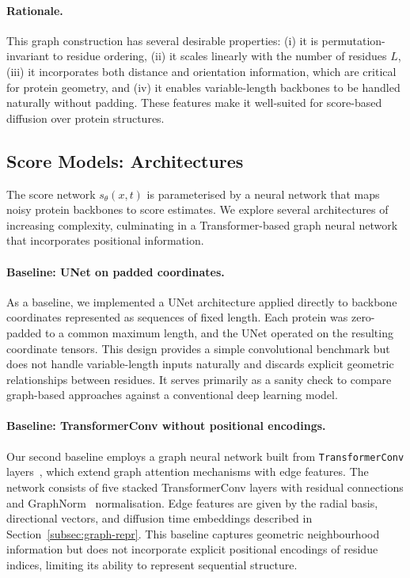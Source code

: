 \documentclass[a4paper,12pt]{article}
\begin{document}
\paragraph{Rationale.}
This graph construction has several desirable properties: (i) it is permutation-invariant to residue ordering, (ii) it scales linearly with the number of residues \(L\), (iii) it incorporates both distance and orientation information, which are critical for protein geometry, and (iv) it enables variable-length backbones to be handled naturally without padding. These features make it well-suited for score-based diffusion over protein structures.

\subsection{Score Models: Architectures}\label{subsec:architectures}
The score network \(s_\theta(x,t)\) is parameterised by a neural network that maps noisy protein backbones to score estimates. We explore several architectures of increasing complexity, culminating in a Transformer-based graph neural network that incorporates positional information.

\paragraph{Baseline: UNet on padded coordinates.}
As a baseline, we implemented a UNet architecture applied directly to backbone coordinates represented as sequences of fixed length. Each protein was zero-padded to a common maximum length, and the UNet operated on the resulting coordinate tensors. This design provides a simple convolutional benchmark but does not handle variable-length inputs naturally and discards explicit geometric relationships between residues. It serves primarily as a sanity check to compare graph-based approaches against a conventional deep learning model.

\paragraph{Baseline: TransformerConv without positional encodings.}
Our second baseline employs a graph neural network built from \texttt{TransformerConv} layers~\cite{PyG1.0,PyG2.0}, which extend graph attention mechanisms with edge features. 
The network consists of five stacked TransformerConv layers with residual connections and GraphNorm~\cite{cai2021GraphNormPrincipledApproach} normalisation. 
Edge features are given by the radial basis, directional vectors, and diffusion time embeddings described in Section~\ref{subsec:graph-repr}. 
This baseline captures geometric neighbourhood information but does not incorporate explicit positional encodings of residue indices, limiting its ability to represent sequential structure.
\end{document}
